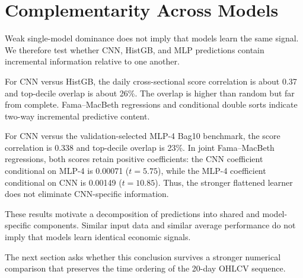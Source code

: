 \section{Complementarity Across Models}

Weak single-model dominance does not imply that models learn the same signal. We therefore test whether CNN, HistGB, and MLP predictions contain incremental information relative to one another.





For CNN versus HistGB, the daily cross-sectional score correlation is about 0.37 and top-decile overlap is about 26\%. The overlap is higher than random but far from complete. Fama--MacBeth regressions and conditional double sorts indicate two-way incremental predictive content.

For CNN versus the validation-selected MLP-4 Bag10 benchmark, the score correlation is 0.338 and top-decile overlap is 23\%. In joint Fama--MacBeth regressions, both scores retain positive coefficients: the CNN coefficient conditional on MLP-4 is 0.00071 ($t=5.75$), while the MLP-4 coefficient conditional on CNN is 0.00149 ($t=10.85$). Thus, the stronger flattened learner does not eliminate CNN-specific information.

These results motivate a decomposition of predictions into shared and model-specific components. Similar input data and similar average performance do not imply that models learn identical economic signals.

The next section asks whether this conclusion survives a stronger numerical comparison that preserves the time ordering of the 20-day OHLCV sequence.
